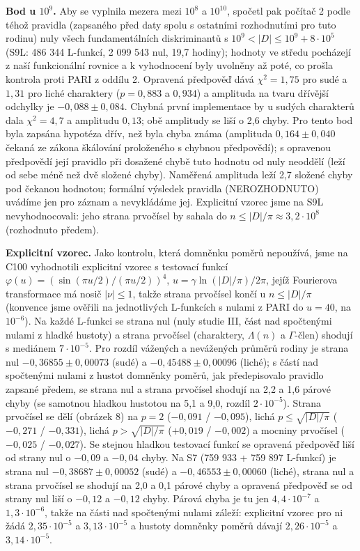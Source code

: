 \documentclass[
  10pt,
]{article}
\begin{document}
\textbf{Bod u \(10^9\).} Aby se vyplnila mezera mezi \(10^8\) a
\(10^{10}\), spočetl pak počítač 2 podle téhož pravidla (zapsaného před
daty spolu s ostatními rozhodnutími pro tuto rodinu) nuly všech
fundamentálních diskriminantů s \(10^9 < |D| \le 10^9 + 8\cdot10^5\)
(S9L: 486 344 L-funkcí, 2 099 543 nul, 19,7 hodiny); hodnoty ve středu
pocházejí z naší funkcionální rovnice a k vyhodnocení byly uvolněny až
poté, co prošla kontrola proti PARI z oddílu 2. Opravená předpověď dává
\(\chi^2 = 1{,}75\) pro sudé a \(1{,}31\) pro liché charaktery
(\(p = 0{,}883\) a \(0{,}934\)) a amplituda na tvaru dřívější odchylky
je \(-0{,}088 \pm 0{,}084\). Chybná první implementace by u sudých
charakterů dala \(\chi^2 = 4{,}7\) a amplitudu \(0{,}13\); obě amplitudy
se liší o 2,6 chyby. Pro tento bod byla zapsána hypotéza dřív, než byla
chyba známa (amplituda \(0{,}164 \pm 0{,}040\) čekaná ze zákona
škálování proloženého s chybnou předpovědí); s opravenou předpovědí její
pravidlo při dosažené chybě tuto hodnotu od nuly neoddělí (leží od sebe
méně než dvě složené chyby). Naměřená amplituda leží 2,7 složené chyby
pod čekanou hodnotou; formální výsledek pravidla (NEROZHODNUTO) uvádíme
jen pro záznam a nevykládáme jej. Explicitní vzorec jsme na S9L
nevyhodnocovali: jeho strana prvočísel by sahala do
\(n \le |D|/\pi \approx 3{,}2\cdot10^8\) (rozhodnuto předem).

\textbf{Explicitní vzorec.} Jako kontrolu, která domněnku poměrů
nepoužívá, jsme na C100 vyhodnotili explicitní vzorec s testovací funkcí
\(\varphi(u) = (\sin(\pi u/2)/(\pi u/2))^4\),
\(u = \gamma\ln(|D|/\pi)/2\pi\), jejíž Fourierova transformace má nosič
\(|\nu| \le 1\), takže strana prvočísel končí u \(n \le |D|/\pi\)
(konvence jsme ověřili na jednotlivých L-funkcích s nulami z PARI do
\(u = 40\), na \(10^{-6}\)). Na každé L-funkci se strana nul (nuly
studie III, část nad spočtenými nulami z hladké hustoty) a strana
prvočísel (charaktery, \(\Lambda(n)\) a \(\Gamma\)-člen) shodují s
mediánem \(7\cdot10^{-5}\). Pro rozdíl vážených a nevážených průměrů
rodiny je strana nul \(-0{,}36855 \pm 0{,}00073\) (sudé) a
\(-0{,}45488 \pm 0{,}00096\) (liché); s částí nad spočtenými nulami z
hustot domněnky poměrů, jak předepisovalo pravidlo zapsané předem, se
strana nul a strana prvočísel shodují na 2,2 a 1,6 párové chyby (se
samotnou hladkou hustotou na 5,1 a 9,0, rozdíl \(2\cdot10^{-5}\)).
Strana prvočísel se dělí (obrázek 8) na \(p = 2\) (\(-0{,}091\) /
\(-0{,}095\)), lichá \(p \le \sqrt{|D|/\pi}\) (\(-0{,}271\) /
\(-0{,}331\)), lichá \(p > \sqrt{|D|/\pi}\) (\(+0{,}019\) /
\(-0{,}002\)) a mocniny prvočísel (\(-0{,}025\) / \(-0{,}027\)). Se
stejnou hladkou testovací funkcí se opravená předpověď liší od strany
nul o \(-0{,}09\) a \(-0{,}04\) chyby. Na S7 (759 933 + 759 897
L-funkcí) je strana nul \(-0{,}38687 \pm 0{,}00052\) (sudé) a
\(-0{,}46553 \pm 0{,}00060\) (liché), strana nul a strana prvočísel se
shodují na 2,0 a 0,1 párové chyby a opravená předpověď se od strany nul
liší o \(-0{,}12\) a \(-0{,}12\) chyby. Párová chyba je tu jen
\(4{,}4\cdot10^{-7}\) a \(1{,}3\cdot10^{-6}\), takže na části nad
spočtenými nulami záleží: explicitní vzorec pro ni žádá
\(2{,}35\cdot10^{-5}\) a \(3{,}13\cdot10^{-5}\) a hustoty domněnky
poměrů dávají \(2{,}26\cdot10^{-5}\) a \(3{,}14\cdot10^{-5}\).
\end{document}
